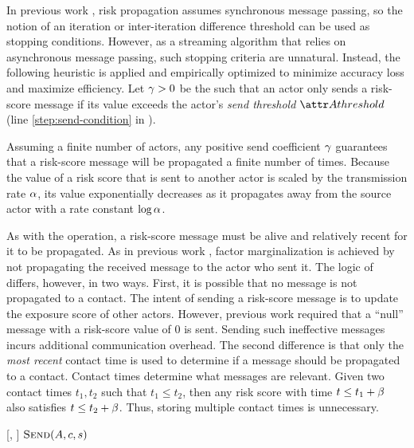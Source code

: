 In previous work \cite{Ayday2021}, risk propagation assumes synchronous message passing, so the notion of an iteration or inter-iteration difference threshold can be used as stopping conditions. However, as a streaming algorithm that relies on asynchronous message passing, such stopping criteria are unnatural. Instead, the following heuristic is applied and empirically optimized to minimize accuracy loss and maximize efficiency. Let $\gamma > 0$ be the  such that an actor only sends a risk-score message if its value exceeds the actor's \emph{send threshold} $\aThreshold{\vActor}$ (line \ref{step:send-condition} in \cPropagate).

Assuming a finite number of actors, any positive send coefficient $\gamma$ guarantees that a risk-score message will be propagated a finite number of times. Because the value of a risk score that is sent to another actor is scaled by the transmission rate $\alpha$, its value exponentially decreases as it propagates away from the source actor with a rate constant $\log \alpha$.

As with the \cSendCurrentOrCached[] operation, a risk-score message must be alive and relatively recent for it to be propagated. As in previous work \cite{Ayday2021}, factor marginalization is achieved by not propagating the received message to the actor who sent it. The logic of \cPropagate[] differs, however, in two ways. First, it is possible that no message is not propagated to a contact. The intent of sending a risk-score message is to update the exposure score of other actors. However, previous work \cite{Ayday2021} required that a ``null'' message with a risk-score value of 0 is sent. Sending such ineffective messages incurs additional communication overhead. The second difference is that only the \emph{most recent} contact time is used to determine if a message should be propagated to a contact. Contact times determine what messages are relevant. Given two contact times $t_1, t_2$ such that $t_1 \leq t_2$, then any risk score with time $t \leq t_1 + \beta$ also satisfies $t \leq t_2 + \beta$. Thus, storing multiple contact times is unnecessary.
%
\begin{function}{\nPropagate}[\vActor, \vScore]
    \ForEach{$\vContact \in \aActorContacts$}
    	\State $\cSend[\vActor, \vContact, \vScore]$
    \EndFor
\end{function}

